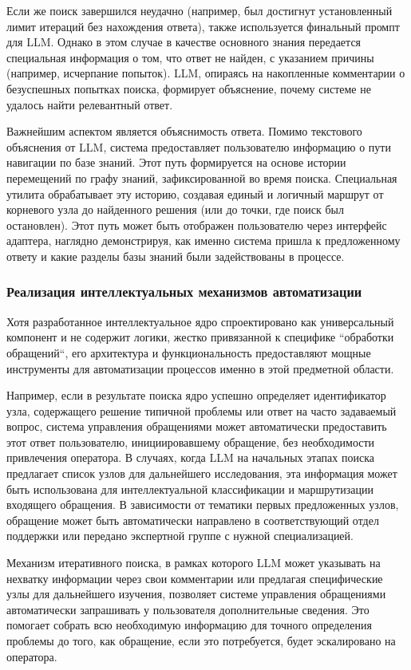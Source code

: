 Если же поиск завершился неудачно (например, был достигнут установленный лимит итераций без нахождения ответа), также используется финальный промпт для LLM. Однако в этом случае в качестве основного знания передается специальная информация о том, что ответ не найден, с указанием причины (например, исчерпание попыток). LLM, опираясь на накопленные комментарии о безуспешных попытках поиска, формирует объяснение, почему системе не удалось найти релевантный ответ.

Важнейшим аспектом является объяснимость ответа. Помимо текстового объяснения от LLM, система предоставляет пользователю информацию о пути навигации по базе знаний. Этот путь формируется на основе истории перемещений по графу знаний, зафиксированной во время поиска. Специальная утилита обрабатывает эту историю, создавая единый и логичный маршрут от корневого узла до найденного решения (или до точки, где поиск был остановлен). Этот путь может быть отображен пользователю через интерфейс адаптера, наглядно демонстрируя, как именно система пришла к предложенному ответу и какие разделы базы знаний были задействованы в процессе.

\subsubsection{Реализация интеллектуальных механизмов автоматизации}

Хотя разработанное интеллектуальное ядро спроектировано как универсальный компонент и не содержит логики, жестко привязанной к специфике ``обработки обращений``, его архитектура и функциональность предоставляют мощные инструменты для автоматизации процессов именно в этой предметной области.

Например, если в результате поиска ядро успешно определяет идентификатор узла, содержащего решение типичной проблемы или ответ на часто задаваемый вопрос, система управления обращениями может автоматически предоставить этот ответ пользователю, инициировавшему обращение, без необходимости привлечения оператора. В случаях, когда LLM на начальных этапах поиска предлагает список узлов для дальнейшего исследования, эта информация может быть использована для интеллектуальной классификации и маршрутизации входящего обращения. В зависимости от тематики первых предложенных узлов, обращение может быть автоматически направлено в соответствующий отдел поддержки или передано экспертной группе с нужной специализацией.

Механизм итеративного поиска, в рамках которого LLM может указывать на нехватку информации через свои комментарии или предлагая специфические узлы для дальнейшего изучения, позволяет системе управления обращениями автоматически запрашивать у пользователя дополнительные сведения. Это помогает собрать всю необходимую информацию для точного определения проблемы до того, как обращение, если это потребуется, будет эскалировано на оператора.

